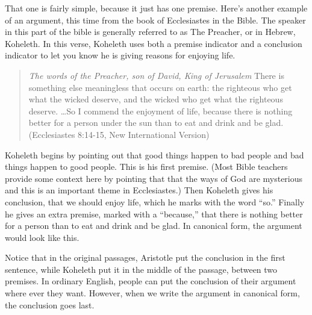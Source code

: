 \begin{kormanize}
\end{kormanize}

That one is fairly simple, because it just has one premise. Here's another example of an argument, this time from the book of Ecclesiastes in the Bible. The speaker in this part of the bible is generally referred to as The Preacher, or in Hebrew, Koheleth. In this verse, Koheleth uses both a premise indicator and a conclusion indicator to let you know he is giving reasons for enjoying life.

\begin{quotation}
\noindent \textit{The words of the Preacher, son of David, King of Jerusalem} There is something else meaningless that occurs on earth: the righteous who get what the wicked deserve, and the wicked who get what the righteous deserve. \ldots So I commend the enjoyment of life, because there is nothing better for a person under the sun than to eat and drink and be glad. (Ecclesiastes 8:14-15, New International Version)
\end{quotation}

Koheleth begins by pointing out that good things happen to bad people and bad things happen to good people. This is his first premise. (Most Bible teachers provide some context here by pointing that that the ways of God are mysterious and this is an important theme in Ecclesiastes.) Then Koheleth gives his conclusion, that we should enjoy life, which he marks with the word ``so.'' Finally he gives an extra premise, marked with a ``because,'' that there is nothing better for a person than to eat and drink and be glad. In canonical form, the argument would look like this.


\begin{kormanize}
\end{kormanize}

Notice that in the original passages, Aristotle put the conclusion in the first sentence, while Koheleth put it in the middle of the passage, between two premises. In ordinary English, people can put the conclusion of their argument where ever they want. However, when we write the argument in canonical form, the conclusion goes last.

